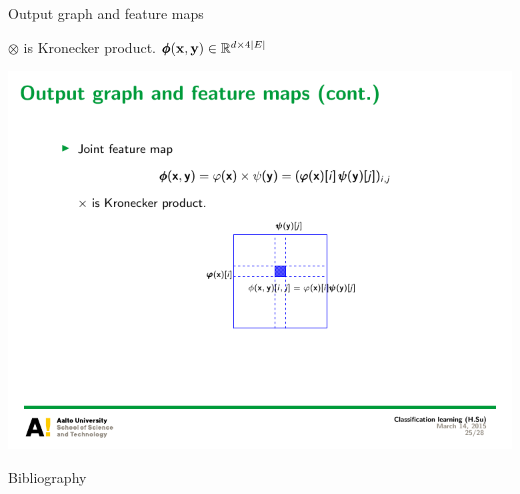 \documentclass[first=dgreen,second=purple,logo=yellowexc]{aaltoslides}
\begin{document}
{\begin{frame}[allowframebreaks]{Output graph and feature maps}
\begin{itemize}
			$\otimes$ is Kronecker product. $\pmb \phi(\mathbf {x},\mathbf {y})\in\mathbb{R}^{d\times4|E|}$
		\begin{center}
			\includegraphics[scale = 1]{./figures/tensor_label.pdf}	
		\end{center}
	\end{itemize}
\end{frame}

\begin{frame}[allowframebreaks]{Bibliography}
%

 
\end{frame}

}
\end{document}
